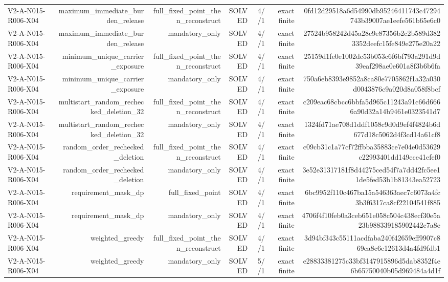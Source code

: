{\begin{longtable}{lrrrrrr}
V2-A-N015-R006-X04 & maximum\_immediate\_burden\_release & full\_fixed\_point\_then\_reconstruct & SOLVED & 4//1 & exact finite & 0fd12d29518a6d54990db95246411743c47294743b39007ae1eefe561b65e6c0 \\
V2-A-N015-R006-X04 & maximum\_immediate\_burden\_release & mandatory\_only & SOLVED & 4//1 & exact finite & 27524b958242d45a28c9e87356b2c2b589d3823352deefc15fe849e275e20a22 \\
V2-A-N015-R006-X04 & minimum\_unique\_carrier\_exposure & full\_fixed\_point\_then\_reconstruct & SOLVED & 4//1 & exact finite & 25159d1fe0e1002dc53b053c6f6bf793a291d9d39eaf298ae0e601a8f3b6b6fa \\
V2-A-N015-R006-X04 & minimum\_unique\_carrier\_exposure & mandatory\_only & SOLVED & 4//1 & exact finite & 750a6eb8393e9852a8ca80e7705862f1a32a030d0043876c9a020d8a058f8bcf \\
V2-A-N015-R006-X04 & multistart\_random\_rechecked\_deletion\_32 & full\_fixed\_point\_then\_reconstruct & SOLVED & 4//1 & exact finite & c209eac68cbcc6bbfa5d965c11243a91c66d6666a90d32a14b9461e0323541d7 \\
V2-A-N015-R006-X04 & multistart\_random\_rechecked\_deletion\_32 & mandatory\_only & SOLVED & 4//1 & exact finite & 1324fd71ae708d1ddf1058c9d0d9ef4f4824b6d677d18c5062d4f3cd14a61cf8 \\
V2-A-N015-R006-X04 & random\_order\_rechecked\_deletion & full\_fixed\_point\_then\_reconstruct & SOLVED & 4//1 & exact finite & c09cb31c1a77cf72ffbba35883ce7e04e0d53629c22993401dd149ece41efef0 \\
V2-A-N015-R006-X04 & random\_order\_rechecked\_deletion & mandatory\_only & SOLVED & 4//1 & exact finite & 3e52e31317181f8d44275ced54f7a7dd42fc5ee11de5fed53b1b81343ea52723 \\
V2-A-N015-R006-X04 & requirement\_mask\_dp & full\_fixed\_point & SOLVED & 4//1 & exact finite & 6bc9952f110c467ba15a546363aec7c6073a4fc3b3f6317ca8cf22104541f885 \\
V2-A-N015-R006-X04 & requirement\_mask\_dp & mandatory\_only & SOLVED & 4//1 & exact finite & 4706f4f10feb0a3ceb651e058c504c438ecf30e5a23b988339185902442c7a8e \\
V2-A-N015-R006-X04 & weighted\_greedy & full\_fixed\_point\_then\_reconstruct & SOLVED & 4//1 & exact finite & 3d94bf343c55111acdfaba240f42659eff9907c869ea8c6e12613d4a4fd9fdb1 \\
V2-A-N015-R006-X04 & weighted\_greedy & mandatory\_only & SOLVED & 5//1 & exact finite & e28833381275c33bf3147915896d5dab8352f4e6b65750040b05d969484a4d1f \\

\end{longtable}}
